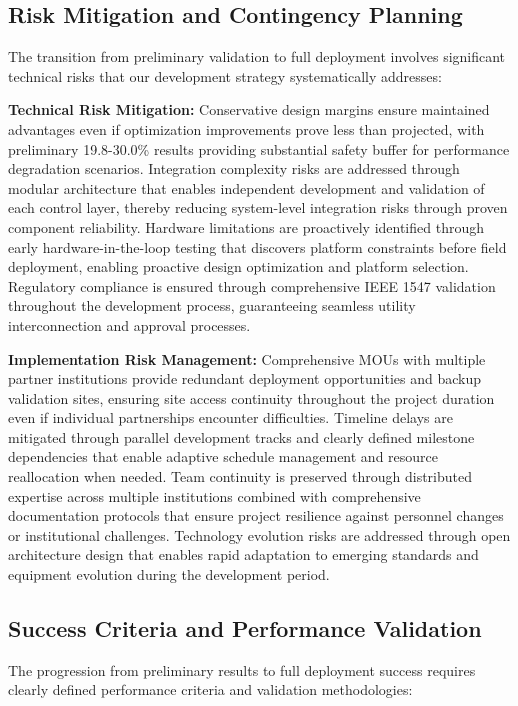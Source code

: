 \documentclass[12pt]{article}
\begin{document}
\subsection{Risk Mitigation and Contingency Planning}

The transition from preliminary validation to full deployment involves significant technical risks that our development strategy systematically addresses:

\textbf{Technical Risk Mitigation:} Conservative design margins ensure maintained advantages even if optimization improvements prove less than projected, with preliminary 19.8-30.0\% results providing substantial safety buffer for performance degradation scenarios. Integration complexity risks are addressed through modular architecture that enables independent development and validation of each control layer, thereby reducing system-level integration risks through proven component reliability. Hardware limitations are proactively identified through early hardware-in-the-loop testing that discovers platform constraints before field deployment, enabling proactive design optimization and platform selection. Regulatory compliance is ensured through comprehensive IEEE 1547 validation throughout the development process, guaranteeing seamless utility interconnection and approval processes.

\textbf{Implementation Risk Management:} Comprehensive MOUs with multiple partner institutions provide redundant deployment opportunities and backup validation sites, ensuring site access continuity throughout the project duration even if individual partnerships encounter difficulties. Timeline delays are mitigated through parallel development tracks and clearly defined milestone dependencies that enable adaptive schedule management and resource reallocation when needed. Team continuity is preserved through distributed expertise across multiple institutions combined with comprehensive documentation protocols that ensure project resilience against personnel changes or institutional challenges. Technology evolution risks are addressed through open architecture design that enables rapid adaptation to emerging standards and equipment evolution during the development period.

\subsection{Success Criteria and Performance Validation}

The progression from preliminary results to full deployment success requires clearly defined performance criteria and validation methodologies:
\end{document}
